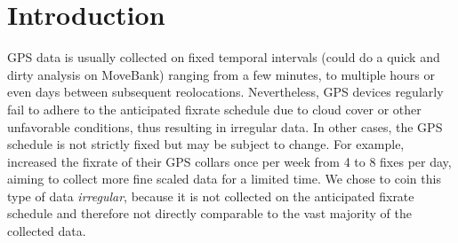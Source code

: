 \documentclass[abstract=on,10pt,a4paper,bibliography=totocnumbered]{article}
\begin{document}
\newpage

\onehalfspacing
\tableofcontents
\doublespacing

\newpage
{}


\section{Introduction}
GPS data is usually collected on fixed temporal intervals (could do a quick and
dirty analysis on MoveBank) ranging from a few minutes, to multiple hours or
even days between subsequent reolocations. Nevertheless, GPS devices regularly
fail to adhere to the anticipated fixrate schedule due to cloud cover or other
unfavorable conditions, thus resulting in irregular data. In other cases, the
GPS schedule is not strictly fixed but may be subject to change. For example,
\cite{Cozzi.2020} increased the fixrate of their GPS collars once per week from
4 to 8 fixes per day, aiming to collect more fine scaled data for a limited
time. We chose to coin this type of data \textit{irregular}, because it is not
collected on the anticipated fixrate schedule and therefore not directly
comparable to the vast majority of the collected data.
\end{document}
